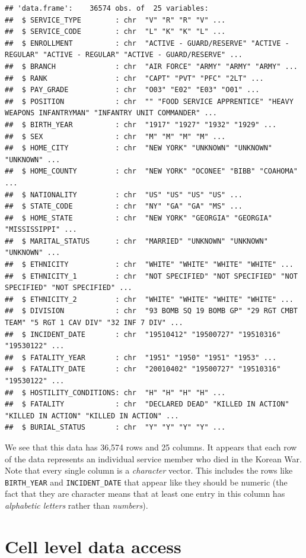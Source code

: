 \documentclass[]{book}
\begin{document}
\begin{verbatim}
## 'data.frame':    36574 obs. of  25 variables:
##  $ SERVICE_TYPE        : chr  "V" "R" "R" "V" ...
##  $ SERVICE_CODE        : chr  "L" "K" "K" "L" ...
##  $ ENROLLMENT          : chr  "ACTIVE - GUARD/RESERVE" "ACTIVE - REGULAR" "ACTIVE - REGULAR" "ACTIVE - GUARD/RESERVE" ...
##  $ BRANCH              : chr  "AIR FORCE" "ARMY" "ARMY" "ARMY" ...
##  $ RANK                : chr  "CAPT" "PVT" "PFC" "2LT" ...
##  $ PAY_GRADE           : chr  "O03" "E02" "E03" "O01" ...
##  $ POSITION            : chr  "" "FOOD SERVICE APPRENTICE" "HEAVY WEAPONS INFANTRYMAN" "INFANTRY UNIT COMMANDER" ...
##  $ BIRTH_YEAR          : chr  "1917" "1927" "1932" "1929" ...
##  $ SEX                 : chr  "M" "M" "M" "M" ...
##  $ HOME_CITY           : chr  "NEW YORK" "UNKNOWN" "UNKNOWN" "UNKNOWN" ...
##  $ HOME_COUNTY         : chr  "NEW YORK" "OCONEE" "BIBB" "COAHOMA" ...
##  $ NATIONALITY         : chr  "US" "US" "US" "US" ...
##  $ STATE_CODE          : chr  "NY" "GA" "GA" "MS" ...
##  $ HOME_STATE          : chr  "NEW YORK" "GEORGIA" "GEORGIA" "MISSISSIPPI" ...
##  $ MARITAL_STATUS      : chr  "MARRIED" "UNKNOWN" "UNKNOWN" "UNKNOWN" ...
##  $ ETHNICITY           : chr  "WHITE" "WHITE" "WHITE" "WHITE" ...
##  $ ETHNICITY_1         : chr  "NOT SPECIFIED" "NOT SPECIFIED" "NOT SPECIFIED" "NOT SPECIFIED" ...
##  $ ETHNICITY_2         : chr  "WHITE" "WHITE" "WHITE" "WHITE" ...
##  $ DIVISION            : chr  "93 BOMB SQ 19 BOMB GP" "29 RGT CMBT TEAM" "5 RGT 1 CAV DIV" "32 INF 7 DIV" ...
##  $ INCIDENT_DATE       : chr  "19510412" "19500727" "19510316" "19530122" ...
##  $ FATALITY_YEAR       : chr  "1951" "1950" "1951" "1953" ...
##  $ FATALITY_DATE       : chr  "20010402" "19500727" "19510316" "19530122" ...
##  $ HOSTILITY_CONDITIONS: chr  "H" "H" "H" "H" ...
##  $ FATALITY            : chr  "DECLARED DEAD" "KILLED IN ACTION" "KILLED IN ACTION" "KILLED IN ACTION" ...
##  $ BURIAL_STATUS       : chr  "Y" "Y" "Y" "Y" ...
\end{verbatim}

We see that this data has 36,574 rows and 25 columns. It appears that
each row of the data represents an individual service member who died in
the Korean War. Note that every single column is a \emph{character}
vector. This includes the rows like \texttt{BIRTH\_YEAR} and
\texttt{INCIDENT\_DATE} that appear like they should be numeric (the
fact that they are character means that at least one entry in this
column has \emph{alphabetic letters} rather than \emph{numbers}).

\section{Cell level data access}\label{cell-level-data-access}
\end{document}
